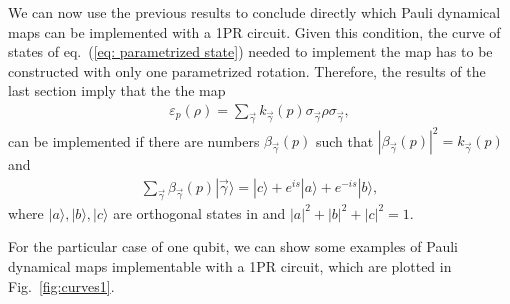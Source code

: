 \documentclass[10pt,letterpaper]{article} %
\newcommand{\fref}[1]{Fig.~\ref{#1}}
\newcommand{\eref}[1]{eq.~(\ref{#1})}
\begin{document}
We can now use the previous results to conclude directly which Pauli dynamical maps
can be implemented with a 1PR circuit.
Given this condition, the curve of states of \eref{eq: parametrized state}  needed 
to implement the map
has to be constructed with only one parametrized rotation. 
Therefore, the results of the last section imply that the the map
\begin{eqnarray}
\varepsilon_p(\rho) = \sum_{\vec{\gamma}} k_{\vec{\gamma}}(p) \sigma_{\vec{\gamma}} \rho \sigma_{\vec{\gamma}},
\end{eqnarray}
can be implemented  if there are numbers $\beta_{\vec{\gamma}}(p)$ such that $|\beta_{\vec{\gamma}}(p)|^2 = k_{\vec{\gamma}}(p)$ and
\begin{eqnarray}
\label{eq:vec}
\sum_{\vec{\gamma}} \beta_{\vec{\gamma}}(p) |\vec{\gamma}\rangle = |c\rangle +  e^{is} |a\rangle + e^{-is}|b\rangle,
\end{eqnarray}
where $|a\rangle,|b\rangle,|c\rangle$ are orthogonal states in  
and $|a|^2+  |b|^2 + |c|^2= 1$.

For the particular case of one qubit,
we can show some examples of Pauli dynamical maps
implementable with a 1PR circuit, which are plotted
in \fref{fig:curves1}.
\end{document}
